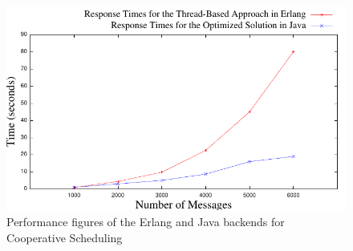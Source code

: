 \begin{figure}
	\label{ej}
	\centering
	\includegraphics[scale=1]{erlj8.pdf}
	\caption{Performance figures of the Erlang and Java backends for Cooperative Scheduling}
\end{figure}



